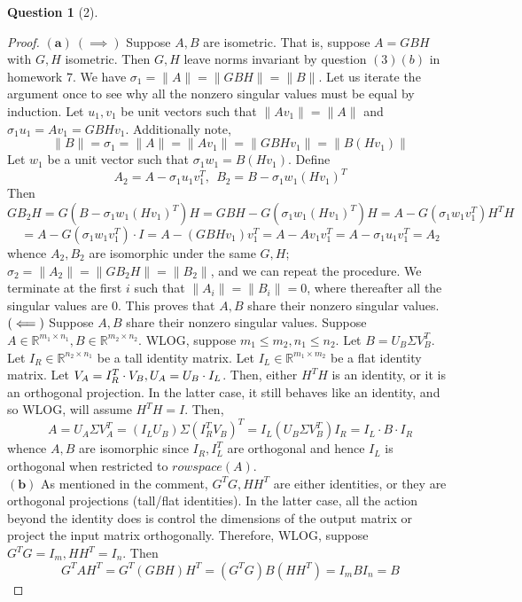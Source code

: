 \documentclass[11pt]{article}
\theoremstyle{quest}
\newtheorem*{question}{Question}
\begin{document}
\begin{question}[2]
\end{question}
\begin{proof}
$\mathbf{(a)}\ (\implies)$ Suppose $A, B$ are isometric. That is, suppose $A = GBH$ with $G, H$ isometric. Then $G, H$ leave norms invariant by question $(3)(b)$ in homework $7$. We have $\sigma_1 = \|A\| = \|GBH\| = \|B\|$. Let us iterate the argument once to see why all the nonzero singular values must be equal by induction. Let $u_1, v_1$ be unit vectors such that $\|Av_1\| = \|A\|$ and $\sigma_1 u_1 = Av_1 = GBHv_1$. Additionally note,
$$\|B\| = \sigma_1 = \|A\| = \|Av_1\| = \|GBHv_1\| = \|B(Hv_1)\|$$
Let $w_1$ be a unit vector such that $\sigma_1 w_1 = B(Hv_1)$. Define
$$A_2 = A - \sigma_1 u_1v_1^T,\ \ B_2 = B - \sigma_1 w_1 (Hv_1)^T$$
Then
$$GB_2H = G(B - \sigma_1 w_1 (Hv_1)^T)H = GBH - G(\sigma_1 w_1 (Hv_1)^T)H = A - G(\sigma_1 w_1v_1^T)H^TH$$
$$= A - G(\sigma_1 w_1v_1^T) \cdot I = A - (GBHv_1)v_1^T = A - Av_1 v_1^T = A - \sigma_1u_1v_1^T = A_2$$
whence $A_2, B_2$ are isomorphic under the same $G, H$; $\sigma_2 = \|A_2\| = \|GB_2H\| = \|B_2\|$, and we can repeat the procedure. We terminate at the first $i$ such that $\|A_i\| = \|B_i\| = 0$, where thereafter all the singular values are $0$. This proves that $A, B$ share their nonzero singular values.
$\\(\impliedby)$ Suppose $A, B$ share their nonzero singular values. Suppose $A \in \mathbb{R}^{m_1 \times n_1}, B \in \mathbb{R}^{m_2 \times n_2}$. WLOG, suppose $m_1 \le m_2, n_1 \le n_2$. Let $B = U_B\Sigma V_B^T$. Let $I_R \in \mathbb{R}^{n_2 \times n_1}$ be a tall identity matrix. Let $I_L \in \mathbb{R}^{m_1 \times m_2}$ be a flat identity matrix. Let $V_A = I_R^T \cdot V_B,\\U_A = U_B \cdot I_L$. Then, either $H^TH$ is an identity, or it is an orthogonal projection. In the latter case, it still behaves like an identity, and so WLOG, will assume $H^TH = I$. Then,
$$A = U_A \Sigma V_A^T = (I_LU_B)\Sigma(I_R^TV_B)^T = I_L (U_B \Sigma V_B^T) I_R = I_L \cdot B \cdot I_R$$
whence $A, B$ are isomorphic since $I_R, I_L^T$ are orthogonal and hence $I_L$ is orthogonal when restricted to $rowspace(A)$.
\\$\mathbf{(b)}$ As mentioned in the comment, $G^TG, HH^T$ are either identities, or they are orthogonal projections (tall/flat identities). In the latter case, all the action beyond the identity does is control the dimensions of the output matrix or project the input matrix orthogonally. Therefore, WLOG, suppose $G^TG = I_m, HH^T = I_n$. Then
$$G^TAH^T = G^T(GBH)H^T = (G^TG)B(HH^T)= I_mB I_n = B$$
\end{proof}
\end{document}
